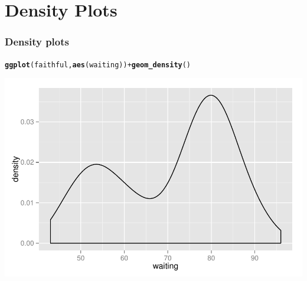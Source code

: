 \documentclass{beamer}\usepackage[]{graphicx}\usepackage[]{color}
\makeatletter
\newcommand{\hlopt}[1]{\textcolor[rgb]{0,0,0}{#1}}%
\newcommand{\hlstd}[1]{\textcolor[rgb]{0.345,0.345,0.345}{#1}}%
\newcommand{\hlkwd}[1]{\textcolor[rgb]{0.737,0.353,0.396}{\textbf{#1}}}%
\newenvironment{kframe}{%
 \def\at@end@of@kframe{}%
 \ifinner\ifhmode%
  \def\at@end@of@kframe{\end{minipage}}%
  \begin{minipage}{\columnwidth}%
 \fi\fi%
 \def\FrameCommand##1{\hskip\@totalleftmargin \hskip-\fboxsep
 \colorbox{shadecolor}{##1}\hskip-\fboxsep
     \hskip-\linewidth \hskip-\@totalleftmargin \hskip\columnwidth}%
 \MakeFramed {\advance\hsize-\width
   \@totalleftmargin\z@ \linewidth\hsize
   \@setminipage}}%
 {\par\unskip\endMakeFramed%
 \at@end@of@kframe}
\newenvironment{knitrout}{}{} %
\makeatother
\begin{document}
\section*{Density Plots}
\frame{\sectionpage}


\begin{frame}[fragile]
\frametitle{Density plots}
\begin{knitrout}\footnotesize
{}\color{fgcolor}\begin{kframe}
\begin{alltt}
\hlkwd{ggplot}\hlstd{(faithful,} \hlkwd{aes}\hlstd{(waiting))} \hlopt{+} \hlkwd{geom_density}\hlstd{()}
\end{alltt}
\end{kframe}

{\centering \includegraphics[width=.75\linewidth]{figure/densityone_} 

}



\end{knitrout}
\end{frame}

\end{document}
